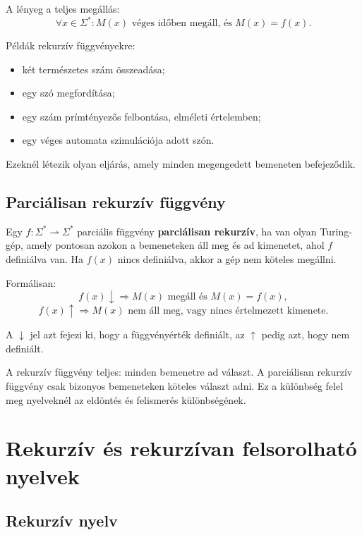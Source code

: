 A lényeg a teljes megállás:
\[
  \forall x\in\Sigma^*:
  M(x) \text{ véges időben megáll, és } M(x)=f(x).
\]

Példák rekurzív függvényekre:

\begin{itemize}
  \item két természetes szám összeadása;
  \item egy szó megfordítása;
  \item egy szám prímtényezős felbontása, elméleti értelemben;
  \item egy véges automata szimulációja adott szón.
\end{itemize}

Ezeknél létezik olyan eljárás, amely minden megengedett bemeneten befejeződik.

\subsection{Parciálisan rekurzív függvény}

Egy $f:\Sigma^*\rightharpoonup\Sigma^*$ parciális függvény \textbf{parciálisan rekurzív}, ha van olyan Turing-gép, amely pontosan azokon a bemeneteken áll meg és ad kimenetet, ahol $f$ definiálva van. Ha $f(x)$ nincs definiálva, akkor a gép nem köteles megállni.

Formálisan:
\[
  f(x)\downarrow \Rightarrow M(x) \text{ megáll és } M(x)=f(x),
\]
\[
  f(x)\uparrow \Rightarrow M(x) \text{ nem áll meg, vagy nincs értelmezett kimenete.}
\]

A $\downarrow$ jel azt fejezi ki, hogy a függvényérték definiált, az $\uparrow$ pedig azt, hogy nem definiált.

\begin{summarybox}
A rekurzív függvény teljes: minden bemenetre ad választ. A parciálisan rekurzív függvény csak bizonyos bemeneteken köteles választ adni. Ez a különbség felel meg nyelveknél az eldöntés és felismerés különbségének.
\end{summarybox}

\section{Rekurzív és rekurzívan felsorolható nyelvek}

\subsection{Rekurzív nyelv}

